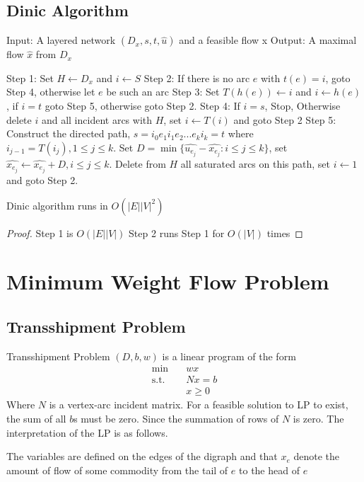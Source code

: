 		\section{Dinic Algorithm}
			Input: A layered network $(D_x, s, t, \hat{u})$ and a feasible flow x
			Output: A maximal flow $\hat{x}$ from $D_x$

			Step 1: Set $H\gets D_x$ and $i\gets S$
			Step 2: If there is no arc $e$ with $t(e) = i$, goto Step 4, otherwise let $e$ be such an arc
			Step 3: Set $T(h(e))\gets i$ and $i \gets h(e)$, if $i= t$ goto Step 5, otherwise goto Step 2.
			Step 4: If $i = s$, Stop, Otherwise delete $i$ and all incident arcs with $H$, set $i \gets T(i)$ and goto Step 2
			Step 5: Construct the directed path, $s = i_0e_1i_1e_2...e_ki_k=t$ where $i_{j-1} = T(i_j), 1\le j \le k$. Set $D=\min\{\hat{u_{e_j}}-\hat{x_{e_j}}:i\le j \le k\}$, set $\hat{x_{e_j}} \gets \hat{x_{e_j}} + D, i \le j \le k$. Delete from $H$ all saturated arcs on this path, set $i \gets 1$ and goto Step 2.

			\begin{theorem}
				Dinic algorithm runs in $O(|E||V|^2)$
			\end{theorem}

			\begin{proof}
				Step 1 is $O(|E||V|)$
				Step 2 runs Step 1 for $O(|V|)$ times
			\end{proof}

	\chapter{Minimum Weight Flow Problem}
		\section{Transshipment Problem}
			Transshipment Problem $(D, b, w)$ is a linear program of the form
			\begin{align}
				\min \quad & wx\\
				\text{s.t.} \quad & Nx = b\\
								  & x \ge 0
			\end{align}
			Where $N$ is a vertex-arc incident matrix. For a feasible solution to LP to exist, the sum of all $b$s must be zero. Since the summation of rows of $N$ is zero. The interpretation of the LP is as follows.

			The variables are defined on the edges of the digraph and that $x_e$ denote the amount of flow of some commodity from the tail of $e$ to the head of $e$

